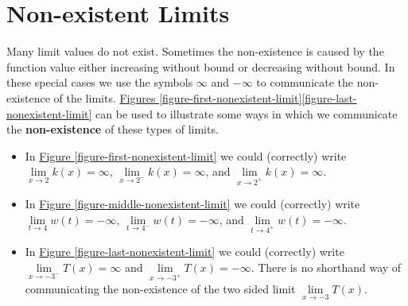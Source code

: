\documentclass[10pt,oneside,]{book}
\newcommand{\terminology}[1]{\textbf{#1}}
\theoremstyle{plain}
\theoremstyle{definition}
\numberwithin{equation}{section}
\newcommand{\fe}[2]{#1\mathopen{}\left(#2\right)\mathclose{}}
\begin{document}
\section[Non-existent Limits]{Non-existent Limits}\label{section-nonexistent-limits}
Many limit values do not exist. Sometimes the non-existence is caused by the function value either increasing without bound or decreasing without bound. In these special cases we use the symbols \(\infty\) and \(-\infty\) to communicate the non-existence of the limits. \hyperref[figure-first-nonexistent-limit]{Figures \ref{figure-first-nonexistent-limit}}\textendash{}\hyperref[figure-last-nonexistent-limit]{\ref{figure-last-nonexistent-limit}} can be used to illustrate some ways in which we communicate the \terminology{non-existence} of these types of limits.%
\begin{itemize}[label=\textbullet]
\item{}In \hyperref[figure-first-nonexistent-limit]{Figure \ref{figure-first-nonexistent-limit}} we could (correctly) write\newline{}\(\lim\limits_{x\to2}\fe{k}{x}=\infty\), \(\lim\limits_{x\to2^{-}}\fe{k}{x}=\infty\), and \(\lim\limits_{x\to2^{+}}\fe{k}{x}=\infty\).\item{}In \hyperref[figure-middle-nonexistent-limit]{Figure \ref{figure-middle-nonexistent-limit}} we could (correctly) write\newline{}\(\lim\limits_{t\to4}\fe{w}{t}=-\infty\), \(\lim\limits_{t\to4^{-}}\fe{w}{t}=-\infty\), and \(\lim\limits_{t\to4^{+}}\fe{w}{t}=-\infty\).\item{}In \hyperref[figure-last-nonexistent-limit]{Figure \ref{figure-last-nonexistent-limit}} we could (correctly) write\newline{}\(\lim\limits_{x\to-3^{-}}\fe{T}{x}=\infty\) and \(\lim\limits_{x\to-3^{+}}\fe{T}{x}=-\infty\).\newline{} There is no shorthand way of communicating the non-existence of the two sided limit \(\lim\limits_{x\to-3}\fe{T}{x}\).\end{itemize}
\end{document}
